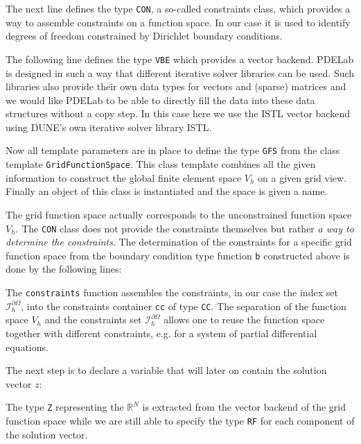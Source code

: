 \documentclass[a4paper,12pt]{article}
\begin{document}
The next line defines the type \lstinline{CON}, a so-called constraints class,
which provides a way to assemble constraints on a function space.
In our case it is used to identify degrees of freedom constrained by
Dirichlet boundary conditions.

The following line defines the type \lstinline{VBE} which provides a
vector backend. PDELab is designed in such a way that different iterative
solver libraries can be used. Such libraries also provide their own data types
for vectors and (sparse) matrices and we would like PDELab to be able to directly fill
the data into these data structures without a copy step. In this case here we use
the ISTL vector backend using DUNE's own iterative solver library ISTL.

Now all template parameters are in place to define the type \lstinline{GFS}
from the class template \lstinline{GridFunctionSpace}. This class template
combines all the given information to construct the global finite element
space $V_h$ on a given grid view. Finally an object of this class is
instantiated and the space is given a name.

The grid function space actually corresponds to the unconstrained
function space $V_h$. The \lstinline{CON} class does not provide
the constraints themselves but rather {\em a way to determine the constraints}.
The determination of the constraints for a specific grid function space from the
boundary condition type function \lstinline{b} constructed above 
is done by the following lines:

The \lstinline{constraints} function assembles the constraints, in our case
the index set $\mathcal{I}_h^{\partial\Omega}$, into the constraints container
\lstinline{cc} of type \lstinline{CC}. The separation of the function space
$V_h$ and the constraints set $\mathcal{I}_h^{\partial\Omega}$ allows
one to reuse the function space together with different constraints, e.g.
for a system of partial differential equations.

The next step is to declare a variable that will later on contain
the solution vector $z$:

The type \lstinline{Z} representing the $\mathbb{R}^N$ is extracted from
the vector backend of the grid function space while we are still
able to specify the type \lstinline{RF} for each component of the 
solution vector.
\end{document}
